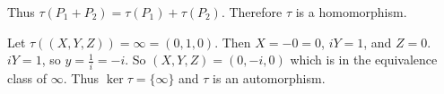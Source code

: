 \documentclass{article}
\begin{document}
Thus $\tau(P_1+P_2) = \tau(P_1)+\tau(P_2)$.
Therefore $\tau$ is a homomorphism.

Let $\tau((X,Y,Z)) = \infty = (0,1,0)$.
Then $X = -0 = 0$, $iY = 1$, and $Z = 0$. $iY = 1$, so $y = \frac{1}{i} = -i$.
So $(X,Y,Z) = (0, -i, 0)$ which is in the equivalence class of $\infty$.
Thus $\ker \tau = \{\infty\}$ and $\tau$ is an automorphism.


\end{document}
